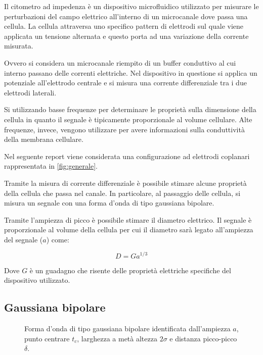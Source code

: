 Il citometro ad impedenza è un dispositivo microfluidico utilizzato per misurare le perturbazioni del campo elettrico all'interno di un microcanale dove passa una cellula. La cellula attraversa uno specifico pattern di elettrodi sul quale viene applicata un tensione alternata e questo porta ad una variazione della corrente misurata.

Ovvero si considera un microcanale riempito di un buffer conduttivo al cui interno passano delle correnti elettriche. Nel dispositivo in questione si applica un potenziale all'elettrodo centrale e si misura una corrente differenziale tra i due elettrodi laterali.

Si utilizzando basse frequenze per determinare le proprietà sulla dimensione della cellula in quanto il segnale è tipicamente proporzionale al volume cellulare. Alte frequenze, invece, vengono utilizzare per avere informazioni sulla conduttività della membrana cellulare.

Nel seguente report viene considerata una configurazione ad elettrodi coplanari rappresentata in \cref{fig:generale}.

Tramite la misura di corrente differenziale è possibile stimare alcune proprietà della cellula che passa nel canale. In particolare, al passaggio delle cellula, si misura un segnale con una forma d'onda di tipo gaussiana bipolare.

Tramite l'ampiezza di picco è possibile stimare il diametro elettrico. Il segnale è proporzionale al volume della cellula per cui il diametro sarà legato all'ampiezza del segnale ($a$) come:


\begin{equation}
	D=G a^{1 / 3}
\end{equation}

Dove $G$ è un guadagno che risente delle proprietà elettriche specifiche del dispositivo utilizzato.

\subsection{Gaussiana bipolare}

\begin{figure}[b!]
		\centering
		\footnotesize{ \def\svgwidth{0.95\linewidth}
			}
	\caption{Forma d'onda di tipo gaussiana bipolare identificata dall'ampiezza $a$, punto centrare $t_c$, larghezza a metà altezza $2\sigma$ e distanza picco-picco $\delta$.}
	\label{fig:gaussiana}
\end{figure}



